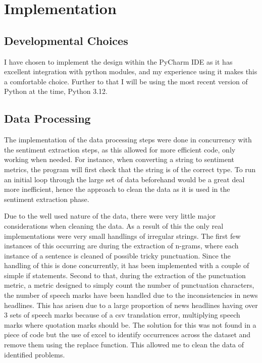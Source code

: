 \documentclass[11pt, a4paper]{article}
\begin{document}
\section{Implementation}
\subsection{Developmental Choices}
I have chosen to implement the design within the PyCharm IDE as it has excellent integration with python modules, and my experience using it makes this a comfortable choice. Further to that I will be using the most recent version of Python at the time, Python 3.12.

\subsection{Data Processing}
The implementation of the data processing steps were done in concurrency with the sentiment extraction steps, as this allowed for more efficient code, only working when needed. For instance, when converting a string to sentiment metrics, the program will first check that the string is of the correct type. To run an initial loop through the large set of data beforehand would be a great deal more inefficient, hence the approach to clean the data as it is used in the sentiment extraction phase.

Due to the well used nature of the data, there were very little major considerations when cleaning the data. As a result of this the only real implementations were very small handlings of irregular strings.
The first few instances of this occurring are during the extraction of n-grams, where each instance of a sentence is cleaned of possible tricky punctuation. Since the handling of this is done concurrently, it has been implemented with a couple of simple if statements.
Second to that, during the extraction of the punctuation metric, a metric designed to simply count the number of punctuation characters, the number of speech marks have been handled due to the inconsistencies in news headlines. This has arisen due to a large proportion of news headlines having over 3 sets of speech marks because of a csv translation error, multiplying speech marks where quotation marks should be. The solution for this was not found in a piece of code but the use of excel to identify occurrences across the dataset and remove them using the replace function. This allowed me to clean the data of identified problems.
\newpage
\end{document}
